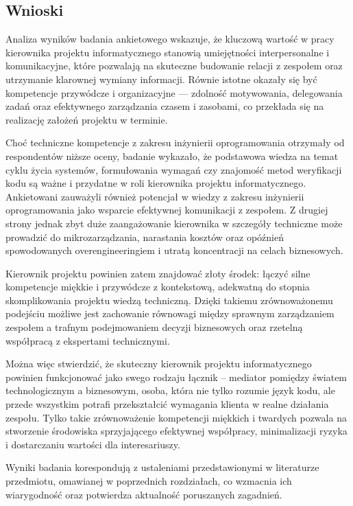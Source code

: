 \subsection{Wnioski}

Analiza wyników badania ankietowego wskazuje, że kluczową wartość w pracy kierownika projektu informatycznego stanowią umiejętności interpersonalne i komunikacyjne, które pozwalają na skuteczne budowanie relacji z zespołem oraz utrzymanie klarownej wymiany informacji. Równie istotne okazały się być kompetencje przywódcze i organizacyjne — zdolność motywowania, delegowania zadań oraz efektywnego zarządzania czasem i zasobami, co przekłada się na realizację założeń projektu w terminie.

Choć techniczne kompetencje z zakresu inżynierii oprogramowania otrzymały od respondentów niższe oceny, badanie wykazało, że podstawowa wiedza na temat cyklu życia systemów, formułowania wymagań czy znajomość metod weryfikacji kodu są ważne i przydatne w roli kierownika projektu informatycznego. Ankietowani zauważyli również potencjał w wiedzy z zakresu inżynierii oprogramowania jako wsparcie efektywnej komunikacji z zespołem. Z drugiej strony jednak zbyt duże zaangażowanie kierownika w szczegóły techniczne może prowadzić do mikrozarządzania, narastania kosztów oraz opóźnień spowodowanych overengineeringiem i utratą koncentracji na celach biznesowych.

Kierownik projektu powinien zatem znajdować złoty środek: łączyć silne kompetencje miękkie i przywódcze z kontekstową, adekwatną do stopnia skomplikowania projektu wiedzą techniczną. Dzięki takiemu zrównoważonemu podejściu możliwe jest zachowanie równowagi między sprawnym zarządzaniem zespołem a trafnym podejmowaniem decyzji biznesowych oraz rzetelną współpracą z ekspertami technicznymi.

Można więc stwierdzić, że skuteczny kierownik projektu informatycznego powinien funkcjonować jako swego rodzaju łącznik – mediator pomiędzy światem technologicznym a biznesowym, osoba, która nie tylko rozumie język kodu, ale przede wszystkim potrafi przekształcić wymagania klienta w realne działania zespołu. Tylko takie zrównoważenie kompetencji miękkich i twardych pozwala na stworzenie środowiska sprzyjającego efektywnej współpracy, minimalizacji ryzyka i dostarczaniu wartości dla interesariuszy.

Wyniki badania korespondują z ustaleniami przedstawionymi w literaturze przedmiotu, omawianej w poprzednich rozdziałach, co wzmacnia ich wiarygodność oraz potwierdza aktualność poruszanych zagadnień.